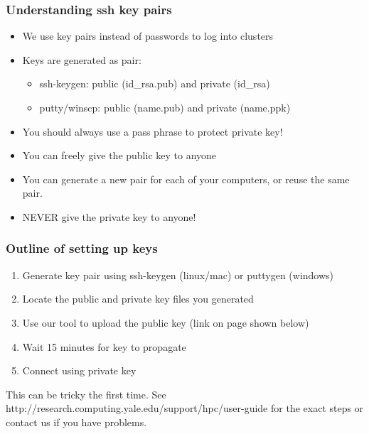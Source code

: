 \documentclass[10pt]{beamer}
\begin{document}
\begin{frame}[fragile]
\frametitle{Understanding ssh key pairs}
\begin{itemize}
\item We use key pairs instead of passwords to log into clusters
\item Keys are generated as pair:
\begin{itemize}
\item ssh-keygen: public (id\_rsa.pub) and private (id\_rsa)
\item putty/winscp: public (name.pub) and private (name.ppk)
\end{itemize}
\item You should always use a pass phrase to protect private key!
\item You can freely give the public key to anyone
\item You can generate a new pair for each of your computers, or reuse the same pair.
\item NEVER give the private key to anyone!
\end{itemize}
\end{frame}

\begin{frame}[fragile]

\frametitle{Outline of setting up keys}
\begin{enumerate}
\item Generate key pair using ssh-keygen (linux/mac) or puttygen (windows)
\item Locate the public and private key files you generated
\item Use our tool to upload the public key (link on page shown below)
\item Wait 15 minutes for key to propagate
\item Connect using private key
\end{enumerate}

This can be tricky the first time.  See http://research.computing.yale.edu/support/hpc/user-guide
for the exact steps or contact us if you have problems.

\end{frame}
\end{document}
